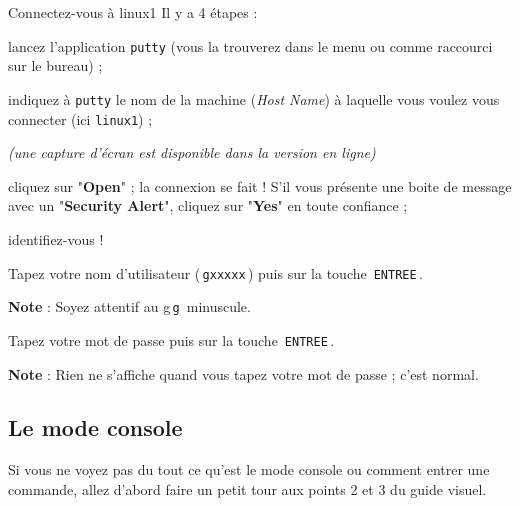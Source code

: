 \documentclass[a4paper,11pt]{article}
\begin{document}
\begin{Tutoriel}{Connectez-vous \`a linux1} 
Il y a 4 \'etapes :
\par
        
\begin{steps}
				
\item lancez l'application \verb_putty_ (vous la trouverez dans le menu ou comme raccourci sur le bureau) ;
					
\item indiquez \`a \verb_putty_ le nom de la machine (\textit{Host Name}) \`a laquelle vous voulez vous connecter (ici \verb_linux1_) ;
{\footnotesize\emph{(une capture d'\'ecran est disponible dans la version en ligne)}\par} 

\item cliquez sur "\textbf{Open}" ; la connexion se fait ! S'il vous pr\'esente une boite de message avec un "\textbf{Security Alert}", cliquez sur "\textbf{Yes}" en toute confiance ;
					
\item identifiez-vous !
						
\begin{steps}
\item Tapez votre nom d'utilisateur (\,\verb|gxxxxx|\,) puis sur la touche \,\verb|ENTREE|\,.\par 
\textbf{Note} : Soyez attentif au g\,\verb|g|\, minuscule.

\item Tapez votre mot de passe puis sur la touche \,\verb|ENTREE|\,.\par
\textbf{Note} : Rien ne s'affiche quand vous tapez votre mot de passe ; c'est normal.
\end{steps}
\end{steps}
\end{Tutoriel}		       

\subsection{Le mode console}
Si vous ne voyez pas du tout ce qu'est le mode console ou comment entrer une commande, allez d'abord faire un petit tour aux points 2 et 3 du guide visuel.
				
\par
        
\end{document}
